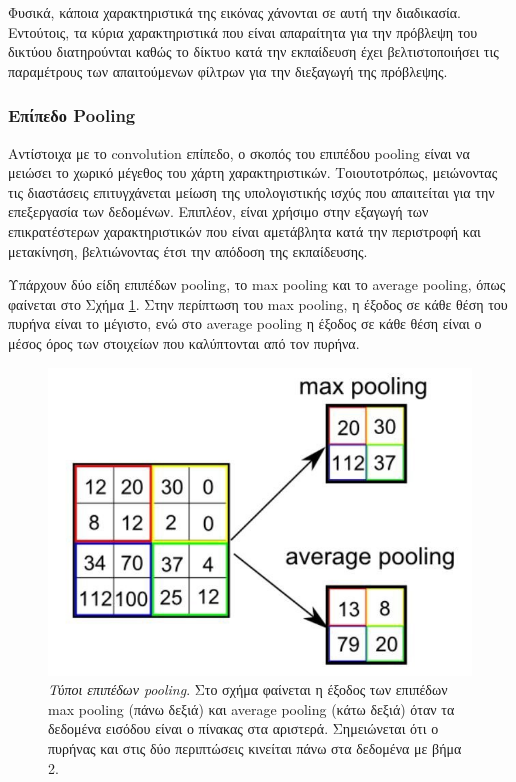 Φυσικά, κάποια χαρακτηριστικά της εικόνας χάνονται σε αυτή την διαδικασία. Εντούτοις, τα κύρια χαρακτηριστικά που είναι απαραίτητα για την πρόβλεψη του δικτύου διατηρούνται καθώς το δίκτυο κατά την εκπαίδευση έχει βελτιστοποιήσει τις παραμέτρους των απαιτούμενων φίλτρων για την διεξαγωγή της πρόβλεψης.

\subsubsection{Επίπεδο Pooling}
\label{definition:pooling}
	Αντίστοιχα με το convolution επίπεδο, ο σκοπός του επιπέδου pooling είναι να μειώσει το χωρικό μέγεθος του χάρτη χαρακτηριστικών. Τοιουτοτρόπως, μειώνοντας τις διαστάσεις επιτυγχάνεται μείωση της υπολογιστικής ισχύς που απαιτείται για την επεξεργασία των δεδομένων. Επιπλέον, είναι χρήσιμο στην εξαγωγή των επικρατέστερων χαρακτηριστικών που είναι αμετάβλητα κατά την περιστροφή και μετακίνηση, βελτιώνοντας έτσι την απόδοση της εκπαίδευσης.
	
	Υπάρχουν δύο είδη επιπέδων pooling, το max pooling και το average pooling, όπως φαίνεται στο Σχήμα \ref{fig:pooling_example}. Στην περίπτωση του max pooling, η έξοδος σε κάθε θέση του πυρήνα είναι το μέγιστο, ενώ στο average pooling η έξοδος σε κάθε θέση είναι ο μέσος όρος των στοιχείων που καλύπτονται από τον πυρήνα.
	
	\begin{figure}[h]
		\centering
		\includegraphics[scale=0.5]{images/appendix/pooling_example.png}
		\caption[Τύποι επιπέδων pooling]{\textsl{Τύποι επιπέδων pooling}. Στο σχήμα φαίνεται η έξοδος των επιπέδων max pooling (πάνω δεξιά) και average pooling (κάτω δεξιά) όταν τα δεδομένα εισόδου είναι ο πίνακας στα αριστερά. Σημειώνεται ότι ο πυρήνας και στις δύο περιπτώσεις κινείται πάνω στα δεδομένα με βήμα 2.}
		\label{fig:pooling_example}
	\end{figure}

